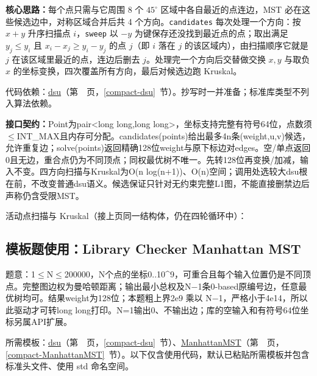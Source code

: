 \textbf{核心思路：}\allowbreak 每个点只需与它周围 8 个 $45^\circ$ 区域中各自最近的点连边，MST 必在这些候选边中，对称区域合并后共 4 个方向。\texttt{candidates} 每次处理一个方向：按 $x+y$ 升序扫描点 $i$，\texttt{sweep} 以 $-y$ 为键保存还没找到最近点的点；取出满足 $y_j\le y_i$ 且 $x_i-x_j\ge y_i-y_j$ 的点 $j$（即 $i$ 落在 $j$ 的该区域内），由扫描顺序它就是 $j$ 在该区域里最近的点，连边后删去 $j$。处理完一个方向后交替做交换 $x,y$ 与取负 $x$ 的坐标变换，四次覆盖所有方向，最后对候选边跑 Kruskal。

代码依赖：\hyperref[compact-dsu]{dsu}（第~\pageref{compact-dsu}~页，\ref{compact-dsu}~节）。抄写时一并准备；标准库类型不列入算法依赖。

{\sloppy{}\noindent\textbf{接口契约：}Point为pair<long long,long long>，坐标支持完整有符号64位，点数须$\le$INT\_MAX且内存可分配。candidates(points)给出最多4n条(weight,u,v)候选，允许重复边；solve(points)返回精确128位weight与原下标边对edges。空/单点返回0且无边，重合点仍为不同顶点；同权最优树不唯一。先转128位再变换/加减，输入不变。四方向扫描与Kruskal为O(n log(n+1))、O(n)空间；调用处选较大dsu根在前，不改变普通dsu语义。候选保证只针对无约束完整L1图，不能直接删禁边后声称仍含受限MST。\par}

\Needspace{387pt}



\newpage

\noindent 活动点扫描与 Kruskal（接上页同一结构体，仍在四轮循环中）：



\Needspace{331pt}

\subsection*{模板题使用：Library Checker Manhattan MST}

\label{usage-example-236}

题意：1$\le$N$\le$200000，N个点的坐标0..10\textasciicircum{}9，可重合且每个输入位置仍是不同顶点。完整图边权为曼哈顿距离；输出最小总权及N−1条0-based原编号边，任意最优树均可。结果weight为128位；本题粗上界2e9 乘以 N−1，严格小于4e14，所以此驱动才可转long long打印。N=1输出0、不输出边；库的空输入和有符号64位坐标另属API扩展。

所需模板：\hyperref[compact-dsu]{dsu}（第~\pageref{compact-dsu}~页，\ref{compact-dsu}~节）、\hyperref[compact-ManhattanMST]{ManhattanMST}（第~\pageref{compact-ManhattanMST}~页，\ref{compact-ManhattanMST}~节）。以下仅含使用代码，默认已粘贴所需模板并包含标准头文件、使用 std 命名空间。

